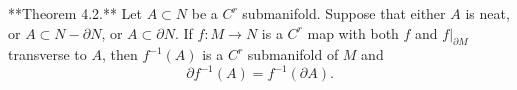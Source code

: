 **Theorem 4.2.** Let $A \subset N$ be a $C^r$ submanifold. Suppose that either $A$ is neat, or $A \subset N - \partial N$, or $A \subset \partial N$. If $f: M \to N$ is a $C^r$ map with both $f$ and $f|_{\partial M}$ transverse to $A$, then $f^{-1}(A)$ is a $C^r$ submanifold of $M$ and
$$\partial f^{-1}(A) = f^{-1}(\partial A).$$
